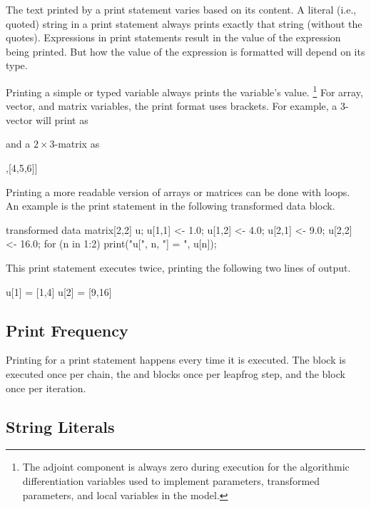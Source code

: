 The text printed by a print statement varies based on its content.  A
literal (i.e., quoted) string in a print statement always prints
exactly that string (without the quotes).  Expressions in print
statements result in the value of the expression being printed.
But how the value of the expression is formatted will depend on its type.

Printing a simple  or  typed variable always
prints the variable's value.%
%
\footnote{The adjoint component is always zero during execution for
  the algorithmic differentiation variables used to implement
  parameters, transformed parameters, and local variables in the model.}
%
For array, vector, and matrix variables, the print format uses
brackets.  For example, a 3-vector will print as
%
\begin{stancode}
[1,2,3]
\end{stancode}
%
and a $2 \times 3$-matrix as
%
\begin{stancode}
[[1,2,3],[4,5,6]]
\end{stancode}
%

Printing a more readable version of arrays or matrices can be done
with loops.  An example is the print statement in the following
transformed data block.
%
\begin{stancode}
transformed data {
  matrix[2,2] u;
  u[1,1] <- 1.0;  u[1,2] <- 4.0;
  u[2,1] <- 9.0;  u[2,2] <- 16.0;
  for (n in 1:2)
    print("u[", n, "] = ", u[n]);
}
\end{stancode}
%
This print statement executes twice, printing the following two lines
of output.
%
\begin{stancode}
u[1] = [1,4]
u[2] = [9,16]
\end{stancode}



\subsection{Print Frequency}

Printing for a print statement happens every time it is executed.  The
 block is executed once per chain, the
 and  blocks once per leapfrog
step, and the  block once per iteration.

\subsection{String Literals}

